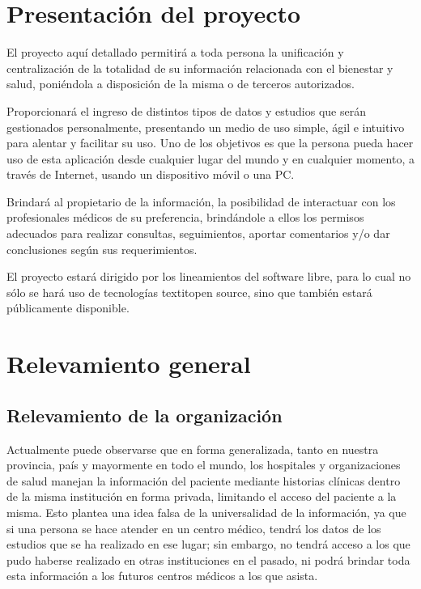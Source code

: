 

\section{Presentación del proyecto}
El proyecto aquí detallado permitirá a toda persona la unificación y centralización de la totalidad de su información relacionada con el bienestar y salud, poniéndola a disposición de la misma o de terceros autorizados.

Proporcionará el ingreso de distintos tipos de datos y estudios que serán gestionados personalmente, presentando un medio de uso simple, ágil e intuitivo para alentar y facilitar su uso.
Uno de los objetivos es que la persona pueda hacer uso de esta aplicación desde cualquier lugar del mundo y en cualquier momento, a través de Internet, usando un dispositivo móvil o una PC.

Brindará al propietario de la información, la posibilidad  de interactuar con los profesionales médicos de su preferencia, brindándole a ellos los permisos adecuados para realizar consultas, seguimientos, aportar comentarios y/o dar conclusiones según sus requerimientos.

El proyecto estará dirigido por los lineamientos del software libre, para lo cual no sólo se hará uso de tecnologías textit{open source}, sino que también estará públicamente disponible.


\section{Relevamiento general}

\subsection{Relevamiento de la organización}

Actualmente puede observarse que en forma generalizada, tanto en nuestra provincia, país y mayormente en todo el mundo, los hospitales y organizaciones de salud manejan la información del paciente mediante historias clínicas dentro de la misma institución en forma privada, limitando el acceso del paciente a la misma.
Esto plantea una idea falsa de la universalidad de la información, ya que si una persona se hace atender en un centro médico, tendrá los datos de los estudios que se ha realizado en ese lugar; sin embargo, no tendrá acceso a los que pudo haberse realizado en otras instituciones en el pasado, ni podrá brindar toda esta información a los futuros centros médicos a los que asista.

